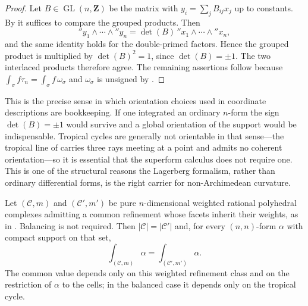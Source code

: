 \begin{proof}
Let $B\in\operatorname{GL}(n,\mathbf Z)$ be the matrix with
$y_i=\sum_jB_{ij}x_j$ up to constants.  By
 it suffices to compare the grouped
products.  Then
\[
 \dprime y_1\wedge\cdots\wedge\dprime y_n=\det(B)\,
 \dprime x_1\wedge\cdots\wedge\dprime x_n,
\]
and the same identity holds for the double-primed factors.  Hence the
grouped product is multiplied by $\det(B)^2=1$, since $\det(B)=\pm1$.  The
two interlaced products therefore agree.  The remaining assertions follow
because $\int_\sigma f\tau_n=\int_\sigma f\,\omega_\sigma$ and
$\omega_\sigma$ is unsigned by
.
\end{proof}

This is the precise sense in which orientation choices used in coordinate
descriptions are bookkeeping.  If one integrated an ordinary
$n$-form the sign $\det(B)=\pm1$ would survive and a global orientation of
the support would be indispensable.  Tropical cycles are generally not
orientable in that sense---the tropical line of
 carries three rays meeting at a point and
admits no coherent orientation---so it is essential that the superform
calculus does not require one.  This is one of the structural reasons the
Lagerberg formalism, rather than ordinary differential forms, is the right
carrier for non-Archimedean curvature.

\begin{proposition}
\label{prop:integral-subdivision-independent}
Let $(\mathscr C,m)$ and $(\mathscr C',m')$ be pure $n$-dimensional weighted
rational polyhedral complexes admitting a common refinement whose facets
inherit their weights, as in .  Balancing is
not required.  Then
$|\mathscr C|=|\mathscr C'|$ and, for every $(n,n)$-form $\alpha$ with
compact support on that set,
\[
 \int_{(\mathscr C,m)}\alpha=\int_{(\mathscr C',m')}\alpha .
\]
The common value depends only on this weighted refinement class and on
the restriction of $\alpha$ to the cells; in the balanced case it depends
only on the tropical cycle.
\end{proposition}

